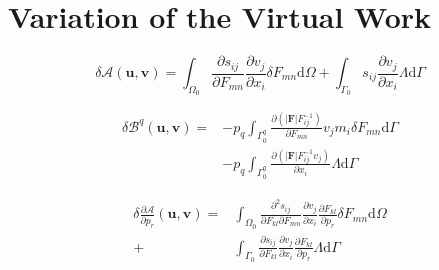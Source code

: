 \documentclass[journal]{IEEEtran}
\theoremstyle{definition}
\begin{document}
\section{Variation of the Virtual Work}
\label{sec:variation_results}


\begin{equation}
    \delta \mathcal{A}(\mathbf{u}, \mathbf{v}) = \int_{\Omega_0}  \frac{\partial s_{ij}}{\partial F_{mn}} \frac{\partial v_j}{\partial x_i} \delta F_{mn} \mathrm{d}\Omega
    + \int_{\Gamma_0} s_{ij} \frac{\partial v_j}{\partial x_i} \Lambda \mathrm{d}\Gamma
  \label{eq:variation_A}
\end{equation}

\begin{equation}
  \begin{split}
  \delta \mathcal{B}^q(\mathbf{u}, \mathbf{v}) = &- p_q\int_{\Gamma^q_0} \frac{\partial\left( \left|\mathbf{F}\right|F_{ij}^{-1}\right)}{\partial F_{mn}} v_j m_i \delta F_{mn} \mathrm{d}\Gamma \\
  &-p_q \int_{\Gamma^q_0} \frac{\partial\left( \left|\mathbf{F}\right|F^{-1}_{ij}v_j\right)}{\partial x_i} \Lambda\mathrm{d}\Gamma
  \end{split}
  \label{eq:variation_Bp}
\end{equation}



\begin{equation}
  \begin{split}
    \delta \frac{\partial \mathcal{A}}{\partial p_r}(\mathbf{u}, \mathbf{v}) = &\int_{\Omega_0} \frac{\partial^2 s_{ij}}{\partial F_{kl} \partial F_{mn}} \frac{\partial v_j}{\partial x_i}\frac{\partial F_{kl}}{\partial p_r} \delta F_{mn} \mathrm{d}\Omega \\
    +&\int_{\Gamma_0} \frac{\partial s_{ij}}{\partial F_{kl}} \frac{\partial v_j}{\partial x_i}\frac{\partial F_{kl}}{\partial p_r} \Lambda \mathrm{d}\Gamma
  \end{split}
  \label{eq:variation_A_xi}
\end{equation}
\end{document}
